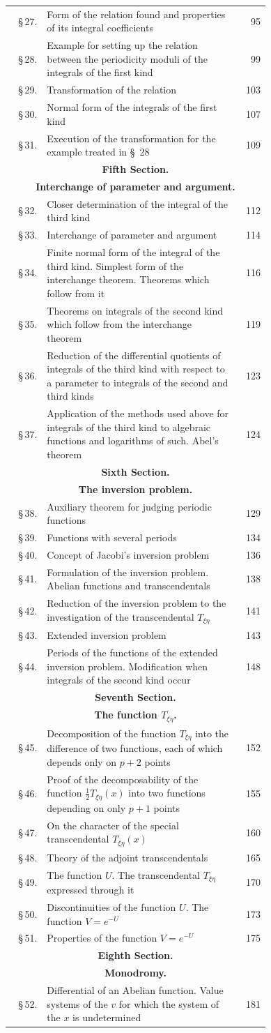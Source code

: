 \documentclass[10pt]{article}
\newcommand{\tocentry}[3]{\S\,#1 & #2 & #3\\}
\newcommand{\tocsec}[2]{\multicolumn{3}{c}{\bfseries #1}\\[-0.15em]\multicolumn{3}{c}{\bfseries #2}\\[0.25em]}
\begin{document}
{\begin{longtable}{@{}r@{\ }p{0.74\linewidth}@{\ }r@{}}
\tocentry{27.}{Form of the relation found and properties of its integral coefficients}{95}
\tocentry{28.}{Example for setting up the relation between the periodicity moduli of the integrals of the first kind}{99}
\tocentry{29.}{Transformation of the relation}{103}
\tocentry{30.}{Normal form of the integrals of the first kind}{107}
\tocentry{31.}{Execution of the transformation for the example treated in \S\ 28}{109}
\tocsec{Fifth Section.}{Interchange of parameter and argument.}
\tocentry{32.}{Closer determination of the integral of the third kind}{112}
\tocentry{33.}{Interchange of parameter and argument}{114}
\tocentry{34.}{Finite normal form of the integral of the third kind. Simplest form of the interchange theorem. Theorems which follow from it}{116}
\tocentry{35.}{Theorems on integrals of the second kind which follow from the interchange theorem}{119}
\tocentry{36.}{Reduction of the differential quotients of integrals of the third kind with respect to a parameter to integrals of the second and third kinds}{123}
\tocentry{37.}{Application of the methods used above for integrals of the third kind to algebraic functions and logarithms of such. Abel's theorem}{124}
\tocsec{Sixth Section.}{The inversion problem.}
\tocentry{38.}{Auxiliary theorem for judging periodic functions}{129}
\tocentry{39.}{Functions with several periods}{134}
\tocentry{40.}{Concept of Jacobi's inversion problem}{136}
\tocentry{41.}{Formulation of the inversion problem. Abelian functions and transcendentals}{138}
\tocentry{42.}{Reduction of the inversion problem to the investigation of the transcendental $T_{\xi\eta}$}{141}
\tocentry{43.}{Extended inversion problem}{143}
\tocentry{44.}{Periods of the functions of the extended inversion problem. Modification when integrals of the second kind occur}{148}
\tocsec{Seventh Section.}{The function $T_{\xi\eta}$.}
\tocentry{45.}{Decomposition of the function $T_{\xi\eta}$ into the difference of two functions, each of which depends only on $p+2$ points}{152}
\tocentry{46.}{Proof of the decomposability of the function $\frac12 T_{\xi\eta}(x)$ into two functions depending on only $p+1$ points}{155}
\tocentry{47.}{On the character of the special transcendental $T_{\xi\eta}(x)$}{160}
\tocentry{48.}{Theory of the adjoint transcendentals}{165}
\tocentry{49.}{The function $U$. The transcendental $T_{\xi\eta}$ expressed through it}{170}
\tocentry{50.}{Discontinuities of the function $U$. The function $V=e^{-U}$}{173}
\tocentry{51.}{Properties of the function $V=e^{-U}$}{175}
\tocsec{Eighth Section.}{Monodromy.}
\tocentry{52.}{Differential of an Abelian function. Value systems of the $v$ for which the system of the $x$ is undetermined}{181}

\end{longtable}}
\end{document}
